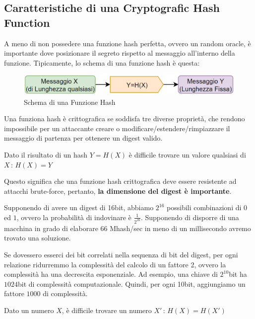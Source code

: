 \subsection{Caratteristiche di una Cryptografic Hash Function}
A meno di non possedere una funzione hash perfetta, ovvero un random oracle, è importante dove posizionare il segreto rispetto al messaggio all'interno della funzione. Tipicamente, lo schema di una funzione hash è questa:
\begin{figure}[H]
    \centering
    \includegraphics[width=\textwidth]{image/hashscheme.png}
    \caption{Schema di una Funzione Hash}
    \label{fig:hashscheme}
\end{figure}
Una funziona hash è crittografica se soddisfa tre diverse proprietà, che rendono impossibile per un attaccante creare o modificare/estendere/rimpiazzare il messaggio di partenza per ottenere un digest valido. 
\begin{theorem}\label{thm:preimageres}
Dato il risultato di un hash $Y=H(X)$ è difficile trovare un valore qualsiasi di $X\,:\,H(X)=Y$
\end{theorem}
Questo significa che una funzione hash crittografica deve essere resistente ad attacchi brute-force, pertanto, \textbf{la dimensione del digest è importante}. 
\begin{example}
Supponendo di avere un digest di 16bit, abbiamo $2^{16}$ possibili combinazioni di $0$ ed $1$, ovvero la probabilità di indovinare è $\frac{1}{2^{16}}$. Supponendo di disporre di una macchina in grado di elaborare $66$ Mhash/sec in meno di un millisecondo avremo trovato una soluzione.
\end{example}
\begin{remark}
Se dovessero esserci dei bit correlati nella sequenza di bit del digest, per ogni relazione ridurremmo la complessità del calcolo di un fattore 2, ovvero la complessità ha una decrescita esponenziale. Ad esempio, una chiave di $2^{10}$bit ha $1024$bit di complessità computazionale. Quindi, per ogni 10bit, aggiungiamo un fattore $1000$ di complessità.
\end{remark}
\begin{theorem}\label{thm:weakcollres}
Dato un numero $X$, è difficile trovare un numero $X'\,:\,H(X)=H(X')$
\end{theorem}
